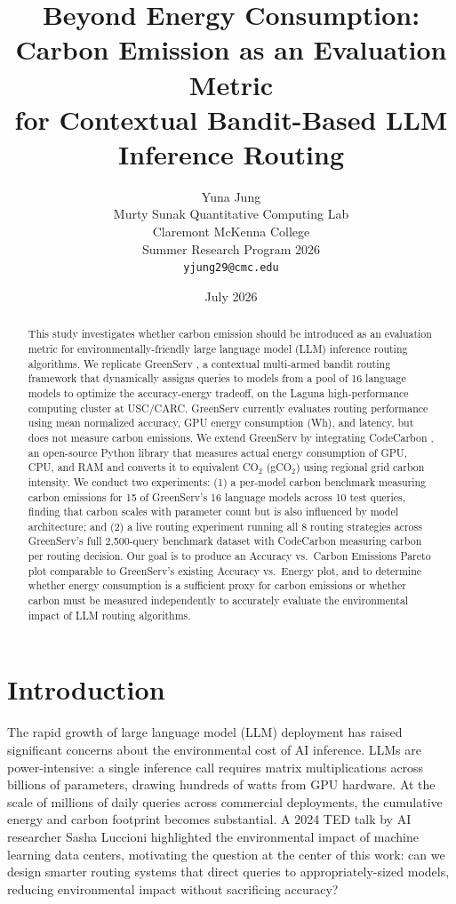\documentclass[12pt]{article}
\title{Beyond Energy Consumption: Carbon Emission as an Evaluation Metric\\
for Contextual Bandit-Based LLM Inference Routing}
\author{Yuna Jung\\
Murty Sunak Quantitative Computing Lab\\
Claremont McKenna College\\
Summer Research Program 2026\\
\texttt{yjung29@cmc.edu}}
\date{July 2026}
\begin{document}
\maketitle

\begin{abstract}
This study investigates whether carbon emission should be introduced as an
evaluation metric for environmentally-friendly large language model (LLM)
inference routing algorithms. We replicate GreenServ \cite{ziller2026}, a
contextual multi-armed bandit routing framework that dynamically assigns
queries to models from a pool of 16 language models to optimize the
accuracy-energy tradeoff, on the Laguna high-performance computing cluster
at USC/CARC. GreenServ currently evaluates routing performance using mean
normalized accuracy, GPU energy consumption (Wh), and latency, but does not
measure carbon emissions. We extend GreenServ by integrating CodeCarbon
\cite{codecarbon2023}, an open-source Python library that measures actual
energy consumption of GPU, CPU, and RAM and converts it to equivalent CO$_2$
(gCO$_2$) using regional grid carbon intensity. We conduct two experiments:
(1) a per-model carbon benchmark measuring carbon emissions for 15 of
GreenServ's 16 language models across 10 test queries, finding that carbon
scales with parameter count but is also influenced by model architecture; and
(2) a live routing experiment running all 8 routing strategies across
GreenServ's full 2,500-query benchmark dataset with CodeCarbon measuring
carbon per routing decision. Our goal is to produce an Accuracy
vs.\ Carbon Emissions Pareto plot comparable to GreenServ's existing Accuracy
vs.\ Energy plot, and to determine whether energy consumption is a sufficient
proxy for carbon emissions or whether carbon must be measured independently
to accurately evaluate the environmental impact of LLM routing algorithms.
\end{abstract}

\section{Introduction}

The rapid growth of large language model (LLM) deployment has raised
significant concerns about the environmental cost of AI inference. LLMs are
power-intensive: a single inference call requires matrix multiplications
across billions of parameters, drawing hundreds of watts from GPU hardware.
At the scale of millions of daily queries across commercial deployments, the
cumulative energy and carbon footprint becomes substantial. A 2024 TED talk
by AI researcher Sasha Luccioni highlighted the environmental impact of
machine learning data centers, motivating the question at the center of this
work: can we design smarter routing systems that direct queries to
appropriately-sized models, reducing environmental impact without sacrificing
accuracy?
\end{document}
